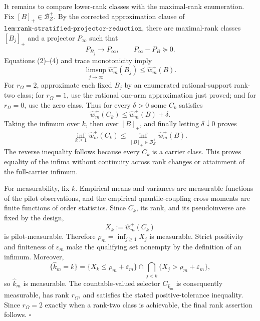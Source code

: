 It remains to compare lower-rank classes with the maximal-rank enumeration.  Fix \([B]_+\in\mathcal B_Z^+\).  By the corrected approximation clause of \(\texttt{lem:rank-stratified-projector-reduction}\), there are maximal-rank classes \([B_j]_+\) and a projector \(P_\infty\) such that
\[
P_{B_j}\longrightarrow P_\infty,
\qquad P_\infty-P_B\succeq0.
\tag{4}
\]
Equations (2)--(4) and trace monotonicity imply
\[
\limsup_{j\to\infty}\widehat w_m^+(B_j)
\le \widehat w_m^+(B).
\tag{5}
\]
For \(r_\Omega=2\), approximate each fixed \(B_j\) by an enumerated rational-support rank-two class; for \(r_\Omega=1\), use the rational one-arm approximation just proved; and for \(r_\Omega=0\), use the zero class.  Thus for every \(\delta>0\) some \(C_k\) satisfies
\[
\widehat w_m^+(C_k)\le\widehat w_m^+(B)+\delta.
\tag{6}
\]
Taking the infimum over \(k\), then over \([B]_+\), and finally letting \(\delta\downarrow0\) proves
\[
\inf_{k\ge1}\widehat w_m^+(C_k)
\le\inf_{[B]_+\in\mathcal B_Z^+}\widehat w_m^+(B).
\tag{7}
\]
The reverse inequality follows because every \(C_k\) is a carrier class.  This proves equality of the infima without continuity across rank changes or attainment of the full-carrier infimum.

For measurability, fix \(k\).  Empirical means and variances are measurable functions of the pilot observations, and the empirical quantile-coupling cross moments are finite functions of order statistics.  Since \(C_k\), its rank, and its pseudoinverse are fixed by the design,
\[
X_k:=\widehat w_m^+(C_k)
\]
is pilot-measurable.  Therefore \(\rho_m=\inf_{j\ge1}X_j\) is measurable.  Strict positivity and finiteness of \(\varepsilon_m\) make the qualifying set nonempty by the definition of an infimum.  Moreover,
\[
\{\widehat k_m=k\}
=\{X_k\le\rho_m+\varepsilon_m\}
\cap\bigcap_{j<k}\{X_j>\rho_m+\varepsilon_m\},
\tag{8}
\]
so \(\widehat k_m\) is measurable.  The countable-valued selector \(C_{\widehat k_m}\) is consequently measurable, has rank \(r_\Omega\), and satisfies the stated positive-tolerance inequality.  Since \(r_\Omega=2\) exactly when a rank-two class is achievable, the final rank assertion follows. \(\square\)